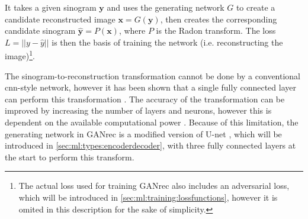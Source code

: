 It takes a given sinogram $\bm{y}$ and uses the generating network $G$ to create a candidate reconstructed image $\bm{x} = G(\bm{y})$, then creates the corresponding candidate sinogram $\hat{\bm{y}} = P(\bm{x})$, where $P$ is the Radon transform. The loss $L = \left|\left| y - \hat{y} \right|\right|$ is then the basis of training the network (i.e. reconstructing the image)\footnote{The actual loss used for training GANrec also includes an adversarial loss, which will be introduced in \cref{sec:ml:training:lossfunctions}, however it is omited in this description for the sake of simplicity. }.

The sinogram-to-reconstruction transformation cannot be done by a conventional \acrshort{cnn}-style network, however it has been shown that a single fully connected layer can perform this transformation \cite{PASCHALIS2004211}. The accuracy of the transformation can be improved by increasing the number of layers and neurons, however this is dependent on the available computational power \cite{GANrec}. Because of this limitation, the generating network in GANrec is a modified version of U-net \cite{unet}, which will be introduced in \cref{sec:ml:types:encoderdecoder}, with three fully connected layers at the start to perform this transform. 